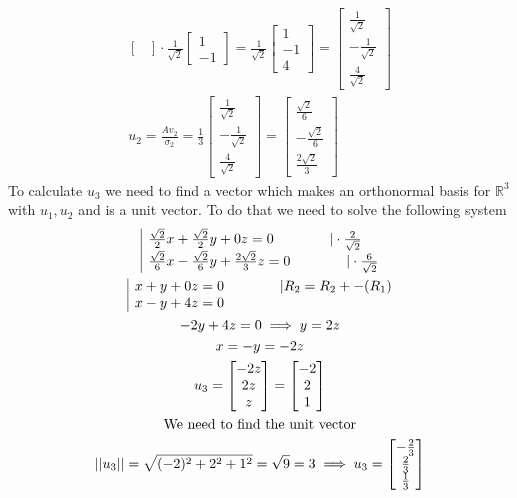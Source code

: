 \documentclass[a4paper,fleqn,12pt]{article}
\begin{document}
\begin{gather*}
\begin{bmatrix}
\end{bmatrix} \cdot 
\frac{1}{\sqrt{2}} \begin{bmatrix} 1 \\-1 \end{bmatrix} = \frac{1}{\sqrt{2}} \begin{bmatrix} 1 \\ -1 \\ 4 \end{bmatrix} = 
\begin{bmatrix} \frac{1}{\sqrt{2}} \\ -\frac{1}{\sqrt{2}}\\ \frac{4}{\sqrt{2}} \end{bmatrix} \\
u_2 = \frac{Av_2}{\sigma_2} = \frac{1}{3} \begin{bmatrix} \frac{1}{\sqrt{2}} \\ -\frac{1}{\sqrt{2}}\\ \frac{4}{\sqrt{2}} \end{bmatrix} = 
\begin{bmatrix} \frac{\sqrt{2}}{6} \\ -\frac{\sqrt{2}}{6}\\ \frac{2\sqrt{2}}{3} \end{bmatrix}
\end{gather*}
To calculate $u_3$ we need to find a vector which makes an orthonormal basis for $\mathbb{R}^3$ with $u_1, u_2$ and is a unit vector. To do that we need to solve the following system
\begin{gather*}
\begin{array}{|l@{}}
	\frac{\sqrt{2}}{2}x + \frac{\sqrt{2}}{2}y + 0z = 0 \qquad \qquad | \cdot \frac{2}{\sqrt{2}}  \\
	\frac{\sqrt{2}}{6}x - \frac{\sqrt{2}}{6}y + \frac{2\sqrt{2}}{3}z = 0  \qquad \qquad | \cdot \frac{6}{\sqrt{2}} 
\end{array} \\
\begin{array}{|l@{}}
	x + y + 0z = 0  \qquad \qquad  | R_2 = R_2 + -(R_1)  \\ 
	x - y +4z = 0 
\end{array} \\
-2y + 4z = 0 \implies  y = 2z \\
x = -y = -2z \\
u_3 = \begin{bmatrix} -2z \\ 2z \\z \end{bmatrix} = \begin{bmatrix} -2 \\ 2 \\1 \end{bmatrix} \\
\text{We need to find the unit vector} \\
||u_3|| = \sqrt{(-2)^2 + 2^2 + 1^2} = \sqrt{9} = 3 \implies u_3 = \begin{bmatrix} - \frac{2}{3} \\ \frac{2}{3} \\ \frac{1}{3} \end{bmatrix} 
\end{gather*}
\end{document}
